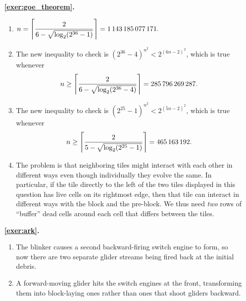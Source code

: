 \begin{multicols}{2}
\begin{itemize}[leftmargin=0em]
		
		\item[\bf\color{ocre}\sffamily\ref{exer:goe_theorem}.] \begin{enumerate}[leftmargin=1.5em,label=\bf\color{ocre}(\alph*)]
			\item $\displaystyle n =  \left\lceil \frac{2}{6-\sqrt{\log_2(2^{36}-1)}} \right\rceil = 1{\,}143{\,}185{\,}077{\,}171.$
			
			\item The new inequality to check is $(2^{36}-4)^{n^2} < 2^{(6n-2)^2}$, which is true whenever \begin{align*}n \geq \left\lceil \frac{2}{6-\sqrt{\log_2(2^{36}-4)}}\right\rceil = 285{\,}796{\,}269{\,}287.\end{align*}
			
			\item The new inequality to check is $(2^{25}-1)^{n^2} < 2^{(5n-2)^2}$, which is true whenever \begin{align*}n \geq \left\lceil \frac{2}{5-\sqrt{\log_2(2^{25}-1)}}\right\rceil = 465{\,}163{\,}192.\end{align*}
			
			\item The problem is that neighboring tiles might interact with each other in different ways even though individually they evolve the same. In particular, if the tile directly to the left of the two tiles displayed in this question has live cells on its rightmost edge, then that tile can interact in different ways with the block and the pre-block. We thus need \emph{two} rows of ``buffer'' dead cells around each cell that differs between the tiles.
		\end{enumerate}
		
		
		\item[\bf\color{ocre}\sffamily\ref{exer:ark}.] \begin{enumerate}[leftmargin=1.5em,label=\bf\color{ocre}(\alph*)]
			\item The blinker causes a second backward-firing switch engine to form, so now there are two separate glider streams being fired back at the initial debris.
			
			\item A forward-moving glider hits the switch engines at the front, transforming them into block-laying ones rather than ones that shoot gliders backward. \\
		\end{enumerate}
	\end{itemize}
\end{multicols}



